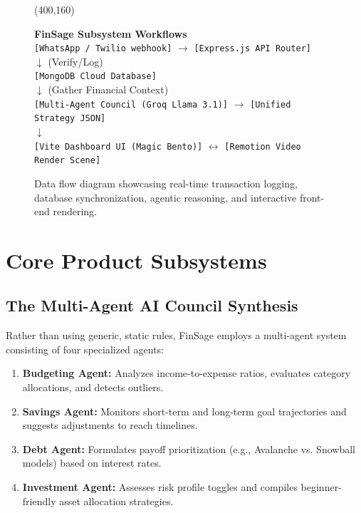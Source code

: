 \documentclass[11pt,a4paper]{article}
\begin{document}
\begin{figure}[htbp]
    \centering
    \color{brandPurple}
    \framebox(400,160){
        \begin{minipage}{5.2in}
            \vspace{0.2cm}
            \centering
            \textbf{\Large FinSage Subsystem Workflows} \\
            \small
            \vspace{0.4cm}
            \texttt{[WhatsApp / Twilio webhook]} $\longrightarrow$ \texttt{[Express.js API Router]} \\
            $\downarrow$ (Verify/Log) \\
            \texttt{[MongoDB Cloud Database]} \\
            $\downarrow$ (Gather Financial Context) \\
            \texttt{[Multi-Agent Council (Groq Llama 3.1)]} $\longrightarrow$ \texttt{[Unified Strategy JSON]} \\
            $\downarrow$ \\
            \texttt{[Vite Dashboard UI (Magic Bento)]} $\longleftrightarrow$ \texttt{[Remotion Video Render Scene]}
            \vspace{0.2cm}
        \end{minipage}
    }
    \caption{Data flow diagram showcasing real-time transaction logging, database synchronization, agentic reasoning, and interactive front-end rendering.}
    \label{fig:arch}
\end{figure}

\section{Core Product Subsystems}

\subsection{The Multi-Agent AI Council Synthesis}
Rather than using generic, static rules, FinSage employs a multi-agent system consisting of four specialized agents:
\begin{enumerate}
    \item \textbf{Budgeting Agent:} Analyzes income-to-expense ratios, evaluates category allocations, and detects outliers.
    \item \textbf{Savings Agent:} Monitors short-term and long-term goal trajectories and suggests adjustments to reach timelines.
    \item \textbf{Debt Agent:} Formulates payoff prioritization (e.g., Avalanche vs. Snowball models) based on interest rates.
    \item \textbf{Investment Agent:} Assesses risk profile toggles and compiles beginner-friendly asset allocation strategies.
\end{enumerate}
\end{document}
